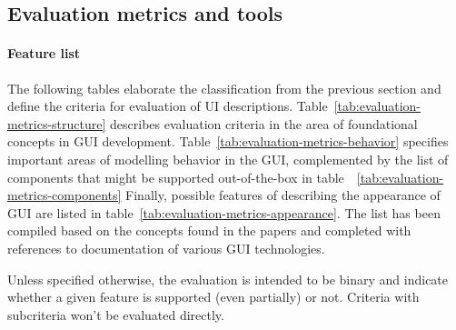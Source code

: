 \subsection{Evaluation metrics and tools}\label{subsec:evaluation-metrics-and-tools}

\paragraph{Feature list}
The following tables elaborate the classification from the previous section and define the criteria for evaluation of UI descriptions.
Table~\ref{tab:evaluation-metrics-structure} describes evaluation criteria in the area of foundational concepts in GUI development.
Table~\ref{tab:evaluation-metrics-behavior} specifies important areas of modelling behavior in the GUI, complemented by the list of components that might be supported out-of-the-box in table~~\ref{tab:evaluation-metrics-components}
Finally, possible features of describing the appearance of GUI are listed in table~\ref{tab:evaluation-metrics-appearance}.
The list has been compiled based on the concepts found in the papers and completed with references to documentation of various GUI technologies.


Unless specified otherwise, the evaluation is intended to be binary and indicate whether a given feature is supported (even partially) or not.
Criteria with subcriteria won't be evaluated directly.



